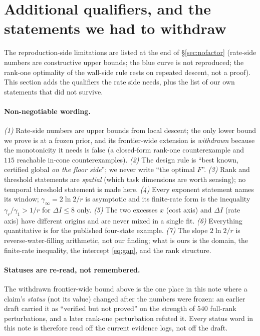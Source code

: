 \section{Additional qualifiers, and the statements we had to withdraw}\label{sec:qual}

The reproduction-side limitations are listed at the end of \S\ref{sec:nofactor}
(rate-side numbers are constructive upper bounds; the blue curve is not
reproduced; the rank-one optimality of the wall-side rule rests on repeated
descent, not a proof). This section adds the qualifiers the rate side needs, plus
the list of our own statements that did not survive.

\paragraph{Non-negotiable wording.}
\emph{(1)} Rate-side numbers are upper bounds from local descent; the only
lower bound we prove is at a frozen prior, and its frontier-wide extension is
\emph{withdrawn} because the monotonicity it needs is false (a closed-form
rank-one counterexample and $115$ reachable in-cone counterexamples).
\emph{(2)} The design rule is ``best known, certified global \emph{on the floor
side}''; we never write ``the optimal $F$''.
\emph{(3)} Rank and threshold statements are \emph{spatial} (which task
dimensions are worth sensing); no temporal threshold statement is made here.
\emph{(4)} Every exponent statement names its window; $\gamma_\infty=2\ln2/r$ is
asymptotic and its finite-rate form is the inequality
$\gamma_r/\gamma_1>1/r$ for $\Delta I\le8$ only.
\emph{(5)} The two excesses $x$ (cost axis) and $\Delta I$ (rate axis) have
different origins and are never mixed in a single fit.
\emph{(6)} Everything quantitative is for the published four-state example.
\emph{(7)} The slope $2\ln2/r$ is reverse-water-filling arithmetic, not our
finding; what is ours is the domain, the finite-rate inequality, the intercept
\eqref{eq:gap}, and the rank structure.

\paragraph{Statuses are re-read, not remembered.} The withdrawn frontier-wide
bound above is the one place in this note where a claim's \emph{status} (not its
value) changed after the numbers were frozen: an earlier draft carried it as
``verified but not proved'' on the strength of $540$ full-rank perturbations, and
a later rank-one perturbation refuted it. Every status word in this note is
therefore read off the current evidence logs, not off the draft.

